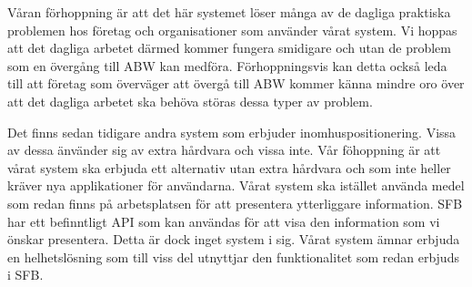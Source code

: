 \documentclass[a4paper,12pt]{article}
\begin{document}
Våran förhoppning är att det här systemet löser många av de dagliga praktiska problemen hos företag och organisationer som använder vårat system. Vi hoppas att det dagliga arbetet därmed kommer fungera smidigare och utan de problem som en övergång till ABW kan medföra. Förhoppningsvis kan detta också leda till att företag som överväger att övergå till ABW kommer känna mindre oro över att det dagliga arbetet ska behöva störas dessa typer av problem.

Det finns sedan tidigare andra system som erbjuder inomhuspositionering. Vissa av dessa änvänder sig av extra hårdvara och vissa inte. Vår föhoppning är att vårat system ska erbjuda ett alternativ utan extra hårdvara och som inte heller kräver nya applikationer för användarna. Vårat system ska istället använda medel som redan finns på arbetsplatsen för att presentera ytterliggare information.
SFB har ett befinntligt API som kan användas för att visa den information som vi önskar presentera. Detta är dock inget system i sig. Vårat system ämnar erbjuda en helhetslösning som till viss del utnyttjar den funktionalitet som redan erbjuds i SFB.







\end{document}
